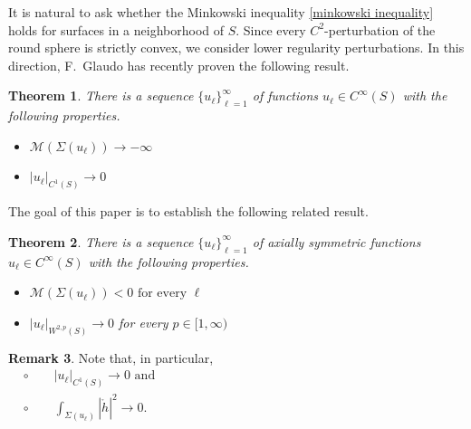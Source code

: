 \documentclass[11pt]{amsart}
\newtheorem{theorem}{Theorem}
\theoremstyle {definition}
\newtheorem{remark}[theorem]{Remark}
\newcommand{\cM}{\mathcal{M}}
\begin{document}
\indent It is natural to ask whether the Minkowski inequality \eqref{minkowski inequality} holds for surfaces in a neighborhood of $S$. Since every $C^2$-perturbation of the round sphere is strictly convex, we consider lower regularity perturbations. In this direction, F.~Glaudo \cite[Appendix A]{Glaudo} has recently proven the following result.
\begin{theorem} \label{glaudo} There is a sequence $\{u_\ell\}_{\ell=1}^\infty$ of functions $u_\ell\in C^\infty(S)$ with the following properties.
	\begin{itemize}
		\item[$\circ$] $\mathcal{M}(\Sigma(u_\ell))\to-\infty$ %
			\item[$\circ$] $|u_\ell|_{C^1(S)}\to0$
	\end{itemize}
	\end{theorem} 
The goal of this paper is to establish the following related result.
\begin{theorem} \label{main result} There is a sequence $\{u_\ell\}_{\ell=1}^\infty$ of axially symmetric functions $u_\ell\in C^\infty(S)$ with the following properties. 
	\begin{itemize}
	\item[$\circ$] $\cM(\Sigma(u_\ell))<0\text{ for every }\ell$ %
	\item[$\circ$] $|u_\ell|_{W^{2,p}(S)}\to0$ for every $p\in[1,\infty)$
\end{itemize}

\end{theorem}
\begin{remark} 
Note that, in particular,
	\begin{align*}
		&\circ \qquad |u_\ell|_{C^1(S)}\to0 \text{ and} \qquad \qquad\qquad\qquad\qquad\qquad\qquad\qquad\qquad\qquad\qquad\qquad\qquad\\[-2pt]
&\circ\qquad \int_{\Sigma(u_\ell)}|\mathring{h}|^2\to 0.
	\end{align*}
\end{remark} 
\end{document}
